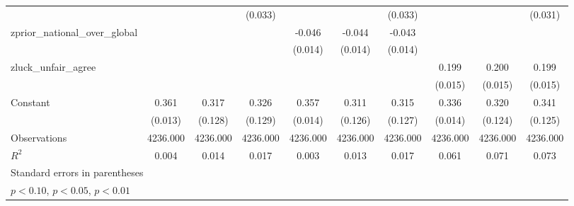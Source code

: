 {\begin{tabular}{l*{9}{c}}
                    &                     &                     &     (0.033)         &                     &                     &     (0.033)         &                     &                     &     (0.031)         \\
\addlinespace
zprior\_national\_over\_global&                     &                     &                     &      -0.046\sym{***}&      -0.044\sym{***}&      -0.043\sym{***}&                     &                     &                     \\
                    &                     &                     &                     &     (0.014)         &     (0.014)         &     (0.014)         &                     &                     &                     \\
\addlinespace
zluck\_unfair\_agree  &                     &                     &                     &                     &                     &                     &       0.199\sym{***}&       0.200\sym{***}&       0.199\sym{***}\\
                    &                     &                     &                     &                     &                     &                     &     (0.015)         &     (0.015)         &     (0.015)         \\
\addlinespace
Constant            &       0.361\sym{***}&       0.317\sym{**} &       0.326\sym{**} &       0.357\sym{***}&       0.311\sym{**} &       0.315\sym{**} &       0.336\sym{***}&       0.320\sym{***}&       0.341\sym{***}\\
                    &     (0.013)         &     (0.128)         &     (0.129)         &     (0.014)         &     (0.126)         &     (0.127)         &     (0.014)         &     (0.124)         &     (0.125)         \\
\midrule
Observations        &    4236.000         &    4236.000         &    4236.000         &    4236.000         &    4236.000         &    4236.000         &    4236.000         &    4236.000         &    4236.000         \\
\(R^{2}\)           &       0.004         &       0.014         &       0.017         &       0.003         &       0.013         &       0.017         &       0.061         &       0.071         &       0.073         \\
\bottomrule
\multicolumn{10}{l}{\footnotesize Standard errors in parentheses}\\
\multicolumn{10}{l}{\footnotesize \sym{*} \(p<0.10\), \sym{**} \(p<0.05\), \sym{***} \(p<0.01\)}\\
\end{tabular}
}
